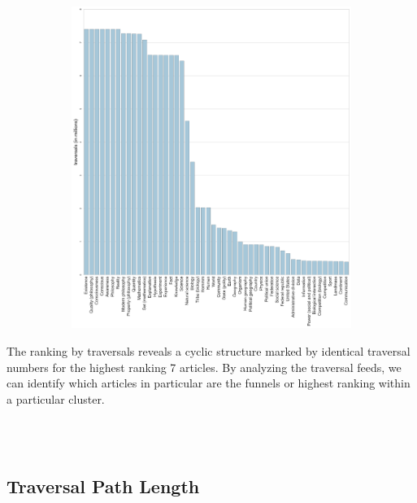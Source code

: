 \documentclass[twoside]{article}
\newcommand{\bt}[1]{\textbf{#1}} %
\newcommand{\red}[1]{{\leavevmode\color{sred}{#1}}} %
\begin{document}
\begin{figure}[H]
\centering
    \caption{highest ranking articles by number of traversals}
    \begin{subfigure}[b]{0.8\textwidth}
        \includegraphics[width=\textwidth, angle=-90]{graphics/top_articles_list.png}
    \end{subfigure}
\end{figure}

The ranking by traversals reveals a cyclic structure marked by identical traversal numbers for the highest ranking 7 articles. By analyzing the traversal feeds, we can identify which articles in particular are the funnels or highest ranking within a particular cluster.

\red{\bt{TODO}}\\
\red{((look at other descriptives about a distribution or even descriptors of power-law))}\\


\subsection{Traversal Path Length}
\end{document}
